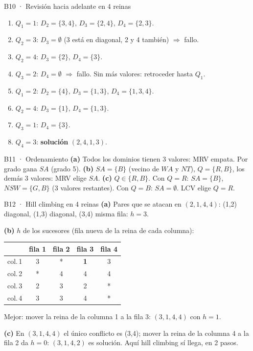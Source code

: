 \begin{solucion}{B10 · Revisión hacia adelante en 4 reinas}
\begin{enumerate}[nosep]
\item $Q_1=1$: $D_2=\{3,4\}$, $D_3=\{2,4\}$, $D_4=\{2,3\}$.
\item \quad $Q_2=3$: $D_3=\emptyset$ (3 está en diagonal, 2 y 4 también) $\Rightarrow$ fallo.
\item \quad $Q_2=4$: $D_3=\{2\}$, $D_4=\{3\}$.
\item \qquad $Q_3=2$: $D_4=\emptyset$ $\Rightarrow$ fallo. Sin más valores: retroceder hasta $Q_1$.
\item $Q_1=2$: $D_2=\{4\}$, $D_3=\{1,3\}$, $D_4=\{1,3,4\}$.
\item \quad $Q_2=4$: $D_3=\{1\}$, $D_4=\{1,3\}$.
\item \qquad $Q_3=1$: $D_4=\{3\}$.
\item \qquad\quad $Q_4=3$: \textbf{solución} $(2,4,1,3)$.
\end{enumerate}
\end{solucion}

\begin{solucion}{B11 · Ordenamiento}
\textbf{(a)} Todos los dominios tienen 3 valores: MRV empata. Por grado gana $SA$ (grado 5).
\textbf{(b)} $SA=\{B\}$ (vecino de $WA$ y $NT$), $Q=\{R,B\}$, los demás 3 valores: MRV elige $SA$.
\textbf{(c)} $Q\in\{R,B\}$. Con $Q=R$: $SA=\{B\}$, $NSW=\{G,B\}$ (3 valores restantes). Con $Q=B$: $SA=\emptyset$.
LCV elige \textbf{$Q=R$}.
\end{solucion}

\begin{solucion}{B12 · Hill climbing en 4 reinas}
\textbf{(a)} Pares que se atacan en $(2,1,4,4)$: (1,2) diagonal, (1,3) diagonal, (3,4) misma fila:
$h=3$.

\textbf{(b)} $h$ de los sucesores (fila nueva de la reina de cada columna):
\begin{center}\small
\begin{tabular}{c|cccc}
 & fila 1 & fila 2 & fila 3 & fila 4\\\hline
col.\,1 & 3 & * & \textbf{1} & 3\\
col.\,2 & * & 4 & 4 & 4\\
col.\,3 & 2 & 3 & 2 & *\\
col.\,4 & 3 & 3 & 4 & *
\end{tabular}
\end{center}
Mejor: mover la reina de la columna 1 a la fila 3: $(3,1,4,4)$ con $h=1$.

\textbf{(c)} En $(3,1,4,4)$ el único conflicto es (3,4); mover la reina de la columna 4 a la fila 2 da
$h=0$: $(3,1,4,2)$ es solución. Aquí hill climbing sí llega, en 2 pasos.
\end{solucion}

